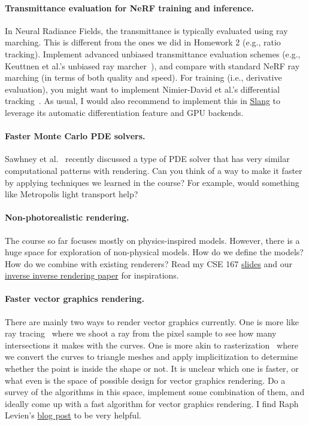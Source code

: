 \paragraph{Transmittance evaluation for NeRF training and inference.}
In Neural Radiance Fields, the transmittance is typically evaluated using ray marching. This is different from the ones we did in Homework 2 (e.g., ratio tracking). Implement advanced unbiased transmittance evaluation schemes (e.g., Keuttnen et al.'s unbiased ray marcher~\cite{Kettunen:2021:URT}), and compare with standard NeRF ray marching (in terms of both quality and speed). For training (i.e., derivative evaluation), you might want to implement Nimier-David et al.'s differential tracking~\cite{Nimier-David:2022:UIV}.
As usual, I would also recommend to implement this in \href{https://developer.nvidia.com/blog/differentiable-slang-example-applications/}{Slang} to leverage its automatic differentiation feature and GPU backends.

\paragraph{Faster Monte Carlo PDE solvers.}
Sawhney et al.~\cite{Sawhney:2020:MCG} recently discussed a type of PDE solver that has very similar computational patterns with rendering. Can you think of a way to make it faster by applying techniques we learned in the course? For example, would something like Metropolis light transport help?

\paragraph{Non-photorealistic rendering.}
The course so far focuses mostly on physics-inspired models. However, there is a huge space for exploration of non-physical models. How do we define the models? How do we combine with existing renderers? Read my CSE 167 \href{https://cseweb.ucsd.edu/~tzli/cse167/fa2023/lectures/17_nonphotorealistic_rendering.pdf}{slides} and our \href{https://people.csail.mit.edu/kach/dpp-dpp/}{inverse inverse rendering paper} for inspirations.

\paragraph{Faster vector graphics rendering.}
There are mainly two ways to render vector graphics currently. One is more like ray tracing~\cite{Ganacim:2014:MVG} where we shoot a ray from the pixel sample to see how many intersections it makes with the curves. One is more akin to rasterization~\cite{Kilgard:2012:GPR} where we convert the curves to triangle meshes and apply implicitization to determine whether the point is inside the shape or not. It is unclear which one is faster, or what even is the space of possible design for vector graphics rendering. Do a survey of the algorithms in this space, implement some combination of them, and ideally come up with a fast algorithm for vector graphics rendering. I find Raph Levien's \href{https://raphlinus.github.io/rust/graphics/gpu/2020/06/13/fast-2d-rendering.html}{blog post} to be very helpful.


